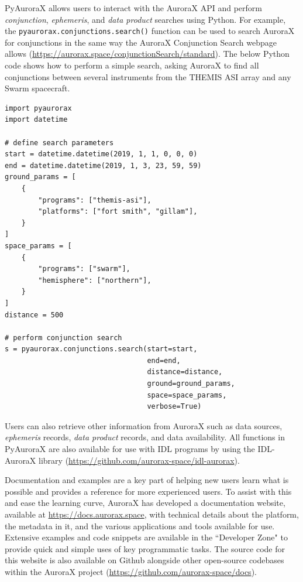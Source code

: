 \documentclass[utf8]{FrontiersinHarvard} %
\begin{document}
PyAuroraX allows users to interact with the AuroraX API and perform \textit{conjunction}, \textit{ephemeris}, and \textit{data product} searches using Python. For example, the \verb|pyaurorax.conjunctions.search()| function can be used to search AuroraX for conjunctions in the same way the AuroraX Conjunction Search webpage allows (\url{https://aurorax.space/conjunctionSearch/standard}). The below Python code shows how to perform a simple search, asking AuroraX to find all conjunctions between several instruments from the THEMIS ASI array and any Swarm spacecraft.

\begin{verbatim}
import pyaurorax
import datetime

# define search parameters
start = datetime.datetime(2019, 1, 1, 0, 0, 0)
end = datetime.datetime(2019, 1, 3, 23, 59, 59)
ground_params = [
    {
        "programs": ["themis-asi"],
        "platforms": ["fort smith", "gillam"],
    }
]
space_params = [
    {
        "programs": ["swarm"],
        "hemisphere": ["northern"],
    }
]
distance = 500

# perform conjunction search
s = pyaurorax.conjunctions.search(start=start,
                                  end=end,
                                  distance=distance,
                                  ground=ground_params,
                                  space=space_params,
                                  verbose=True)
\end{verbatim}

Users can also retrieve other information from AuroraX such as data sources, \textit{ephemeris} records, \textit{data product} records, and data availability. All functions in PyAuroraX are also available for use with IDL programs by using the IDL-AuroraX library (\url{https://github.com/aurorax-space/idl-aurorax}). 

Documentation and examples are a key part of helping new users learn what is possible and provides a reference for more experienced users. To assist with this and ease the learning curve, AuroraX has developed a documentation website, available at \url{https://docs.aurorax.space}, with technical details about the platform, the metadata in it, and the various applications and tools available for use. Extensive examples and code snippets are available in the ``Developer Zone" to provide quick and simple uses of key programmatic tasks. The source code for this website is also available on Github alongside other open-source codebases within the AuroraX project (\url{https://github.com/aurorax-space/docs}). 
\end{document}
